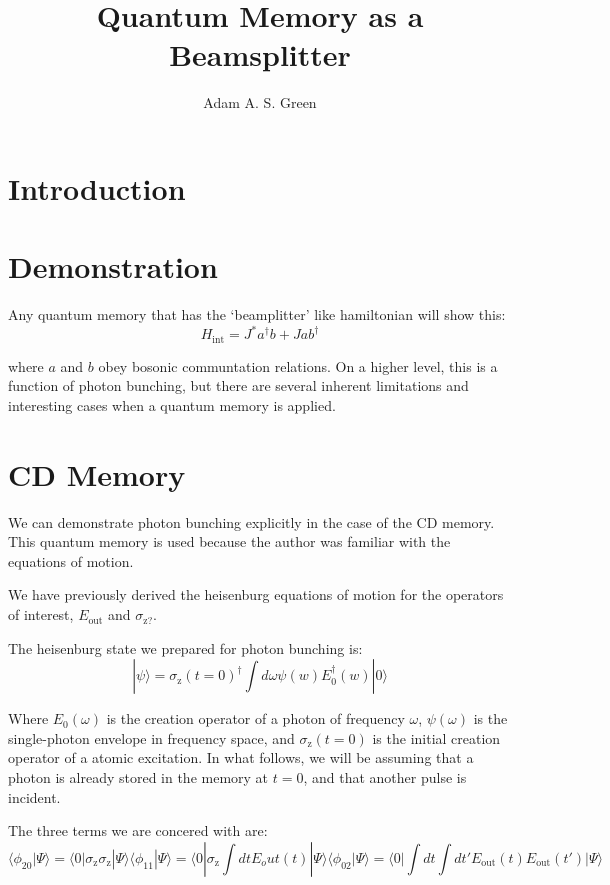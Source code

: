 \documentclass[12pt]{article}
\author{Adam A. S. Green}
\title{Quantum Memory as a Beamsplitter}
\begin{document}


\maketitle
\section{Introduction}


\section{Demonstration}

Any quantum memory that has the `beamplitter' like hamiltonian will show this:
\begin{equation}
H_{\textrm{int}}= J^* a^\dagger b + J a b^\dagger
\end{equation}

where $a$ and $b$ obey bosonic communtation relations. On a higher level, this is a function of photon bunching, but there are several inherent limitations and interesting cases when a quantum memory is applied.

\section{CD Memory}
We can demonstrate photon bunching explicitly in the case of the CD memory\cite{arxiv}. This quantum memory is used because the author was familiar with the equations of motion.

We have previously derived the heisenburg equations of motion for the operators of interest, $E_{\textrm{out}}$ and $\sigma_{\textrm{z?}}$.

The heisenburg state we prepared for photon bunching is:
\begin{equation}
| \psi \rangle = \sigma_\textrm{z}(t=0)^\dagger \int d\omega \psi(w) E_0^\dagger(w) | 0 \rangle
\end{equation}

Where $E_0(\omega)$ is the creation operator of a photon of frequency $\omega$, $\psi(\omega)$ is the single-photon envelope in frequency space, and $\sigma_\textrm{z}(t=0)$ is the initial creation operator of a atomic excitation. In what follows, we will be assuming that a photon is already stored in the memory at $t=0$, and that another pulse is incident.

The three terms we are concered with are:
\begin{equation}
\langle \phi_{20}| \Psi \rangle =\langle 0 | \sigma_\textrm{z} \sigma_\textrm{z} | \Psi \rangle
\langle \phi_{11} | \Psi \rangle =\langle 0 | \sigma_\textrm{z} \int dt E_out(t) | \Psi \rangle
\langle \phi_{02} | \Psi \rangle = \langle 0 | \int dt \int dt' E_\textrm{out}(t) E_\textrm{out}(t') | \Psi \rangle
\end{equation}
\end{document}
